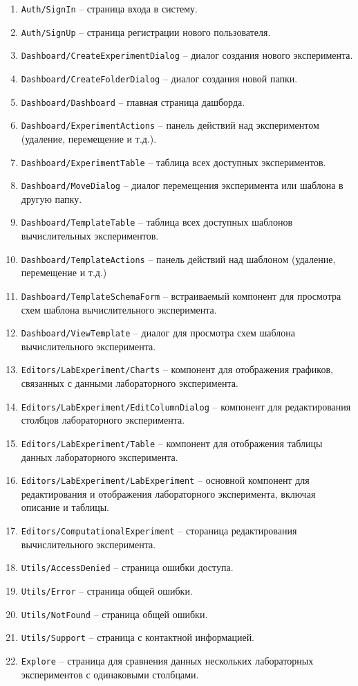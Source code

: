 \begin{enumerate}
    \item \texttt{Auth/SignIn} -- страница входа в систему.
    \item \texttt{Auth/SignUp} -- страница регистрации нового пользователя.
    \item \texttt{Dashboard/CreateExperimentDialog} -- диалог создания нового эксперимента.
    \item \texttt{Dashboard/CreateFolderDialog} -- диалог создания новой папки.
    \item \texttt{Dashboard/Dashboard} -- главная страница дашборда.
    \item \texttt{Dashboard/ExperimentActions} -- панель действий над экспериментом (удаление, перемещение и т.д.).
    \item \texttt{Dashboard/ExperimentTable} -- таблица всех доступных экспериментов.
    \item \texttt{Dashboard/MoveDialog} -- диалог перемещения эксперимента или шаблона в другую папку.
    \item \texttt{Dashboard/TemplateTable} -- таблица всех доступных шаблонов вычислительных экспериментов.
    \item \texttt{Dashboard/TemplateActions} -- панель действий над шаблоном (удаление, перемещение и т.д.)
    \item \texttt{Dashboard/TemplateSchemaForm} -- встраиваемый компонент для просмотра схем шаблона вычислительного эксперимента.
    \item \texttt{Dashboard/ViewTemplate} -- диалог для просмотра схем шаблона вычислительного эксперимента.
    \item \texttt{Editors/LabExperiment/Charts} -- компонент для отображения графиков, связанных с данными лабораторного эксперимента.
    \item \texttt{Editors/LabExperiment/EditColumnDialog} -- компонент для редактирования столбцов лабораторного эксперимента.
    \item \texttt{Editors/LabExperiment/Table} -- компонент для отображения таблицы данных лабораторного эксперимента.
    \item \texttt{Editors/LabExperiment/LabExperiment} -- основной компонент для редактирования и отображения лабораторного эксперимента, включая описание и таблицы.
    \item \texttt{Editors/ComputationalExperiment} -- стораница редактирования вычислительного эксперимента.
    \item \texttt{Utils/AccessDenied} -- страница ошибки доступа.
    \item \texttt{Utils/Error} -- страница общей ошибки.
    \item \texttt{Utils/NotFound} -- страница общей ошибки.
    \item \texttt{Utils/Support} -- страница с контактной информацией.
    \item \texttt{Explore} -- страница для сравнения данных нескольких лабораторных экспериментов с одинаковыми столбцами.
\end{enumerate}

